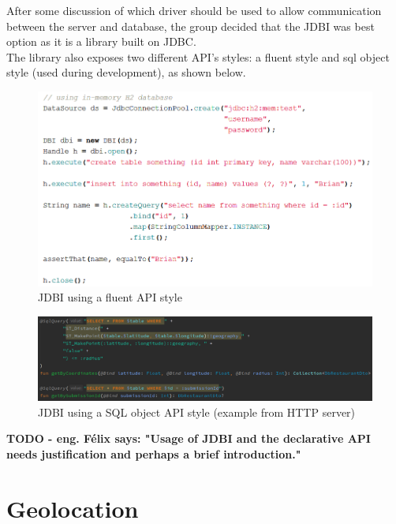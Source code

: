 After some discussion of which driver should be used to allow communication between the server and database, the group decided that the JDBI was best
option as it is a library built on JDBC.\\

The library also exposes two different API's styles: a fluent style and sql object style (used during development), as shown below.

\begin{figure}[H]
    \begin{center}
        \includegraphics[scale=0.5]{_figures/fluentApiJdbi.png}
        \caption{JDBI using a fluent API style}
    \end{center}
\end{figure}

\begin{figure}[H]
    \begin{center}
        \includegraphics[scale=0.5]{_figures/sqlObjectJdbi.png}
        \caption{JDBI using a SQL object API style (example from HTTP server)}
    \end{center}
\end{figure}

\textbf{TODO - eng. Félix says: "Usage of JDBI and the declarative API needs justification and perhaps a brief introduction."}

\section{Geolocation}

